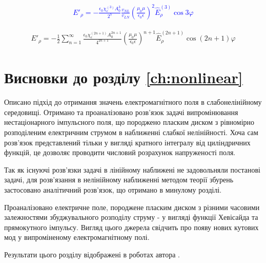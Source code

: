 \textcolor{blue} { \begin{equation*} \begin{aligned}
E'_\rho = - \frac{\epsilon_0 \chi_e^{(3)} A_0^3}{2^7}
\frac{v_{NL}}{v_{LN}}
\left( \frac{\mu_0 \mu}{\epsilon_0 \epsilon} \right)^2 
\hat{E}_\rho^{(3)} \cos 3 \varphi
\end{aligned} \end{equation*} }

\begin{equation*} \begin{aligned}
E'_\rho = - \frac{1}{2} \sum_{n=1}^{\infty} 
\frac{\epsilon_0 \chi_e^{(2n+1)} A_0^{2n+1} }{ 4^{2n+1} }
\left( \frac{\mu_0 \mu}{\epsilon_0 \epsilon} \right)^{n+1}
\hat{E}_\rho^{(2n+1)} \cos (2n + 1) \varphi
\end{aligned} \end{equation*}

\section*{Висновки до розділу \ref{ch:nonlinear}}

Описано підхід до отримання значень електромагнітного поля в слабонелінійному 
середовищі. Отримано та проаналізовано розв’язок задачі випромінювання 
нестаціонарного імпульсного поля, що породжено пласким диском з рівномірно 
розподіленим електричним струмом в наближенні слабкої нелінійності. Хоча сам 
розв’язок представлений тільки у вигляді кратного інтегралу від циліндричних 
функцій, це дозволяє проводити числовий розрахунок напруженості поля.

Так як існуючі розв’язки задачі в лінійному наближені не задовольняли постанові 
задачі, для розв'язання в нелінійному наближенні методом теорії збурень
застосовано аналітичний розв'язок, що отримано в минулому розділі.

Проаналізовано електричне поле, породжене пласким диском з різними часовими 
залежностями збуджувального розподілу струму - у вигляді функції Хевісайда та 
прямокутного імпульсу. Вигляд цього джерела свідчить про появу нових кутових 
мод у випроміненому електромагнітному полі.

Результати цього розділу відображені в роботах автора 
\cite{my:Vesnik2015, my:Vesnik2017, my:Vesnik2017-2, my:MMET2014,
my:UWBUSIS2014, my:ICATT2015, my:UWBUSIS2016, my:KPI2016, my:DIPED2019}.

